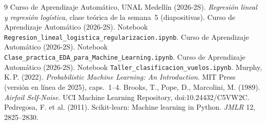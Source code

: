 \documentclass[10pt,a4paper]{article}
\begin{document}
\begin{thebibliography}{9}\small\setlength{\itemsep}{1pt}
 Curso de Aprendizaje Automático, UNAL Medellín (2026-2S). \emph{Regresión lineal y regresión logística}, clase teórica de la semana~5 (diapositivas).
 Curso de Aprendizaje Automático (2026-2S). Notebook \texttt{Regresion\_lineal\_logistica\_regularizacion.ipynb}.
 Curso de Aprendizaje Automático (2026-2S). Notebook \texttt{Clase\_practica\_EDA\_para\_Machine\_Learning.ipynb}.
 Curso de Aprendizaje Automático (2026-2S). Notebook \texttt{Taller\_clasificacion\_vuelos.ipynb}.
 Murphy, K.\,P. (2022). \emph{Probabilistic Machine Learning: An Introduction}. MIT Press (versión en línea de 2025), caps.~1--4.
 Brooks, T., Pope, D., Marcolini, M. (1989). \emph{Airfoil Self-Noise}. UCI Machine Learning Repository, doi:10.24432/C5VW2C.
 Pedregosa, F. et al. (2011). Scikit-learn: Machine learning in Python. \emph{JMLR} 12, 2825--2830.
\end{thebibliography}
\end{document}
